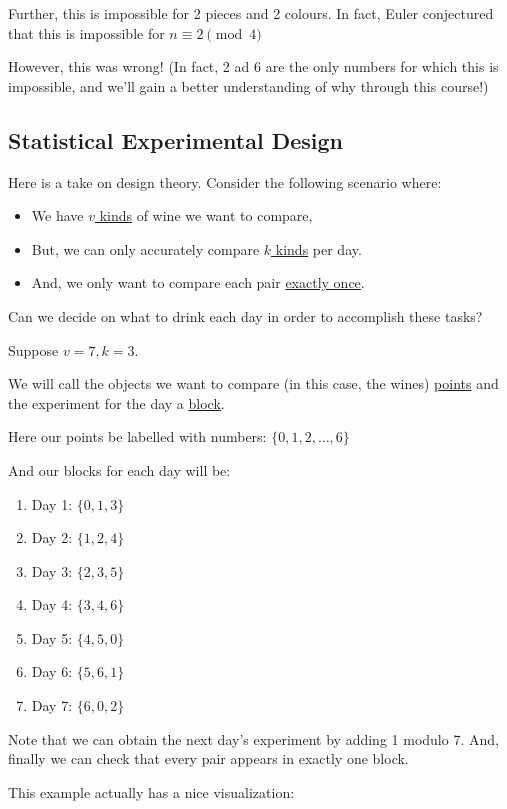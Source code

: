 Further, this is impossible for 2 pieces and 2 colours.
In fact, Euler conjectured that this is impossible for $n \equiv 2 \pmod{4}$

However, this was wrong! (In fact, 2 ad 6 are the only numbers for which this is impossible, and we'll gain a better understanding of why through this course!)

\subsection{Statistical Experimental Design}
Here is a take on design theory.
Consider the following scenario where:
\begin{itemize}
    \item We have \ul{$v$ kinds} of wine we want to compare,
    \item But, we can only accurately compare \ul{$k$ kinds} per day.
    \item And, we only want to compare each pair \ul{exactly once}.
\end{itemize}
Can we decide on what to drink each day in order to accomplish these tasks?

\begin{example}\label{lec1:exmp-fano-plane}
    Suppose $v = 7, k = 3$.

    We will call the objects we want to compare (in this case, the wines) \ul{points} and the experiment for the day a \ul{block}.

    Here our points be labelled with numbers: $\{0, 1, 2, \ldots, 6\}$

    And our blocks for each day will be:
    \begin{enumerate}[label=]
        \item Day 1: $\{0, 1, 3\}$
        \item Day 2: $\{1, 2, 4\}$
        \item Day 3: $\{2, 3, 5\}$
        \item Day 4: $\{3, 4, 6\}$
        \item Day 5: $\{4, 5, 0\}$
        \item Day 6: $\{5, 6, 1\}$
        \item Day 7: $\{6, 0, 2\}$
    \end{enumerate}
    Note that we can obtain the next day's experiment by adding 1 modulo 7.
    And, finally we can check that every pair appears in exactly one block.
\end{example}
This example actually has a nice visualization:

